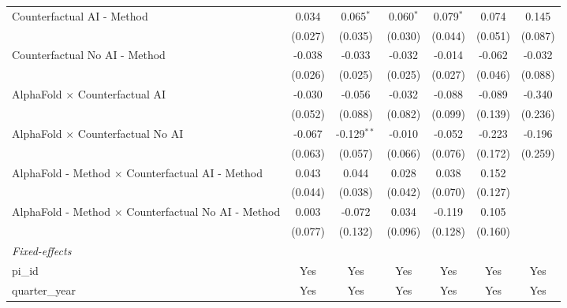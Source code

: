 \begin{tabular}{lcccccc}
   Counterfactual AI - Method                                 & 0.034        & 0.065$^{*}$   & 0.060$^{*}$ & 0.079$^{*}$  & 0.074       & 0.145\\   
                                                              & (0.027)      & (0.035)       & (0.030)     & (0.044)      & (0.051)     & (0.087)\\   
   Counterfactual No AI - Method                              & -0.038       & -0.033        & -0.032      & -0.014       & -0.062      & -0.032\\   
                                                              & (0.026)      & (0.025)       & (0.025)     & (0.027)      & (0.046)     & (0.088)\\   
   AlphaFold $\times$ Counterfactual AI                       & -0.030       & -0.056        & -0.032      & -0.088       & -0.089      & -0.340\\   
                                                              & (0.052)      & (0.088)       & (0.082)     & (0.099)      & (0.139)     & (0.236)\\   
   AlphaFold $\times$ Counterfactual No AI                    & -0.067       & -0.129$^{**}$ & -0.010      & -0.052       & -0.223      & -0.196\\   
                                                              & (0.063)      & (0.057)       & (0.066)     & (0.076)      & (0.172)     & (0.259)\\   
   AlphaFold - Method $\times$ Counterfactual AI - Method     & 0.043        & 0.044         & 0.028       & 0.038        & 0.152       &   \\   
                                                              & (0.044)      & (0.038)       & (0.042)     & (0.070)      & (0.127)     &   \\   
   AlphaFold - Method $\times$ Counterfactual No AI - Method  & 0.003        & -0.072        & 0.034       & -0.119       & 0.105       &   \\   
                                                              & (0.077)      & (0.132)       & (0.096)     & (0.128)      & (0.160)     &   \\   
   \midrule
   \emph{Fixed-effects}\\
   pi\_id                                                     & Yes          & Yes           & Yes         & Yes          & Yes         & Yes\\  
   quarter\_year                                              & Yes          & Yes           & Yes         & Yes          & Yes         & Yes\\  

\end{tabular}

